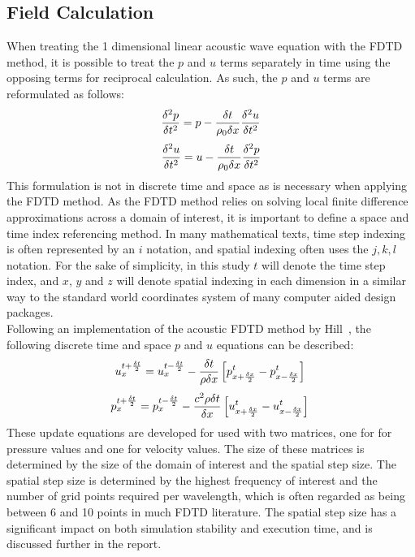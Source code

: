 \subsection{Field Calculation}
When treating the 1 dimensional linear acoustic wave equation with the FDTD method, it is possible to treat the $p$ and $u$ terms separately in time using the opposing terms for reciprocal calculation. As such, the $p$ and $u$ terms are reformulated as follows:\\
\begin{equation}
\frac{\delta^2 p}{\delta t^2} = p - \frac{\delta t}{\rho_0 \delta x} \frac{\delta^2 u}{\delta t^{2}}\\
\end{equation}
\begin{equation}
\frac{\delta^2 u}{\delta t^2} = u - \frac{\delta t}{\rho_0 \delta x} \frac{\delta^2 p}{\delta t^{2}}\\
\end{equation}
This formulation is not in discrete time and space as is necessary when applying the FDTD method. As the FDTD method relies on solving local finite difference approximations across a domain of interest, it is important to define a space and time index referencing method. In many mathematical texts, time step indexing is often represented by an $i$ notation, and spatial indexing often uses the $j,k,l$ notation. For the sake of simplicity, in this study $t$ will denote the time step index, and $x$, $y$ and $z$ will denote spatial indexing in each dimension in a similar way to the standard world coordinates system of many computer aided design packages.\\
Following an implementation of the acoustic FDTD method by Hill~\cite{Hill2012}, the following discrete time and space $p$ and $u$ equations can be described:\\
\begin{equation}
u^{t + \frac{\delta t}{2}}_{x} = u^{t - \frac{\delta t}{2}}_{x} - \frac{\delta t}{\rho \delta x} \left[p^{t}_{x + \frac{\delta x}{2}} - p^{t}_{x - \frac{\delta x}{2}}\right]\\
\end{equation}
\begin{equation}
p^{t + \frac{\delta t}{2}}_{x} = p^{t - \frac{\delta t}{2}}_{x} - \frac{c^2 \rho \delta t}{\delta x} \left[u^{t}_{x + \frac{\delta x}{2}} - u^{t}_{x - \frac{\delta x}{2}}\right]\\
\end{equation}
These update equations are developed for used with two matrices, one for for pressure values and one for velocity values. The size of these matrices is determined by the size of the domain of interest and the spatial step size. The spatial step size is determined by the highest frequency of interest and the number of grid points required per wavelength, which is often regarded as being between 6 and 10 points in much FDTD literature. The spatial step size has a significant impact on both simulation stability and execution time, and is discussed further in the report.

